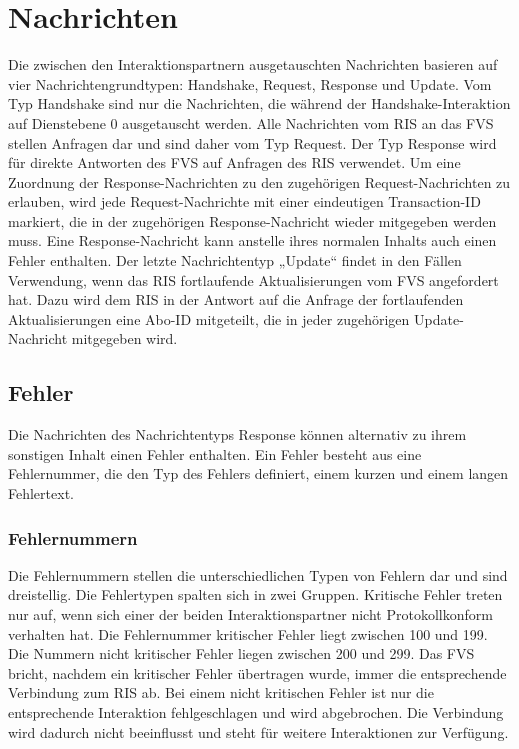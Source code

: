 \chapter{Nachrichten}
\label{sec:Nachrichten}
Die zwischen den Interaktionspartnern ausgetauschten Nachrichten basieren auf vier Nachrichtengrundtypen: Handshake, Request, Response und Update. Vom Typ Handshake sind nur die Nachrichten, die während der Handshake-Interaktion auf Dienstebene 0 ausgetauscht werden. Alle Nachrichten vom RIS an das FVS stellen Anfragen dar und sind daher vom Typ Request. Der Typ Response wird für direkte Antworten des FVS auf Anfragen des RIS verwendet. Um eine Zuordnung der Response-Nachrichten zu den zugehörigen Request-Nachrichten zu erlauben, wird jede Request-Nachrichte mit einer eindeutigen Transaction-ID markiert, die in der zugehörigen Response-Nachricht wieder mitgegeben werden muss. Eine Response-Nachricht kann anstelle ihres normalen Inhalts auch einen Fehler enthalten. Der letzte Nachrichtentyp „Update“ findet in den Fällen Verwendung, wenn das RIS fortlaufende Aktualisierungen vom FVS angefordert hat. Dazu wird dem RIS in der Antwort auf die Anfrage der fortlaufenden Aktualisierungen eine Abo-ID mitgeteilt, die in jeder zugehörigen Update-Nachricht mitgegeben wird.



\section{Fehler}
Die Nachrichten des Nachrichtentyps Response können alternativ zu ihrem sonstigen Inhalt einen Fehler enthalten. Ein Fehler besteht aus eine Fehlernummer, die den Typ des Fehlers definiert, einem kurzen und einem langen Fehlertext.




\subsection{Fehlernummern}
Die Fehlernummern stellen die unterschiedlichen Typen von Fehlern dar und sind dreistellig. Die Fehlertypen spalten sich in zwei Gruppen. Kritische Fehler treten nur auf, wenn sich einer der beiden Interaktionspartner nicht Protokollkonform verhalten hat. Die Fehlernummer kritischer Fehler liegt zwischen 100 und 199. Die Nummern nicht kritischer Fehler liegen zwischen 200 und 299. Das FVS bricht, nachdem ein kritischer Fehler übertragen wurde, immer die entsprechende Verbindung zum RIS ab. Bei einem nicht kritischen Fehler ist nur die entsprechende Interaktion fehlgeschlagen und wird abgebrochen. Die Verbindung wird dadurch nicht beeinflusst und steht für weitere Interaktionen zur Verfügung.

